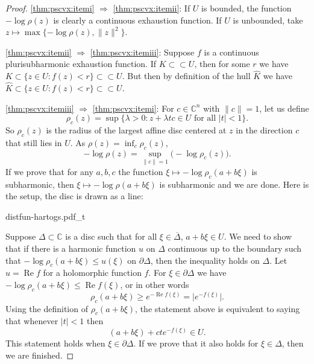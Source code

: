 \documentclass[12pt,openany]{book}
\renewcommand{\Re}{\operatorname{Re}}
\newcommand{\sabs}[1]{\lvert {#1} \rvert}
\newcommand{\snorm}[1]{\lVert {#1} \rVert}
\newcommand{\babs}[1]{\bigl\lvert {#1} \bigr\rvert}
\newcommand{\C}{{\mathbb{C}}}
\newcommand{\D}{{\mathbb{D}}}
\theoremstyle{plain}
\theoremstyle{remark}
\theoremstyle{definition}
\theoremstyle{exercise}
\theoremstyle{example}
\begin{document}
\begin{proof}
\eqref{thm:pscvx:itemi}
$\Rightarrow$
\eqref{thm:pscvx:itemii}:
If $U$ is bounded,
the function $-\log \rho(z)$ is clearly a continuous exhaustion function.
If $U$ is unbounded, take 
$z \mapsto \max \{ -\log \rho(z) , \snorm{z}^2 \}$.

\eqref{thm:pscvx:itemii}
$\Rightarrow$
\eqref{thm:pscvx:itemiii}:
Suppose $f$ is a continuous plurisubharmonic exhaustion function.
If $K \subset \subset U$, then for some $r$ we have
$K \subset \{ z \in U : f(z) < r \} \subset \subset U$.
But then by definition of the hull $\widehat{K}$ we have
$\widehat{K} \subset \{ z \in U : f(z) < r \} \subset \subset U$.

\eqref{thm:pscvx:itemiii}
$\Rightarrow$
\eqref{thm:pscvx:itemi}:
For $c \in \C^n$ with $\snorm{c}=1$, let us define
\begin{equation*}
\rho_c(z) =
\sup \bigl\{ \lambda > 0 :
z+ \lambda t c \in U \text{ for all $\sabs{t} < 1$} \bigr\} .
\end{equation*}
So $\rho_c(z)$ is the radius of the largest affine disc centered at $z$
in the direction $c$ that still lies in $U$.
As $\rho(z) = \inf_c \rho_c(z)$,
\begin{equation*}
- \log \rho(z) = \sup_{\snorm{c}=1} \bigl(-\log \rho_c(z)\bigr) .
\end{equation*}
If we prove that for any $a, b, c$ the function $\xi \mapsto -\log \rho_c(a+b\xi)$ is
subharmonic, then $\xi \mapsto - \log \rho(a+b\xi)$ is subharmonic and we are done.
Here is the setup, the disc is drawn as a line:

\begin{center}
{distfun-hartogs.pdf_t}
\end{center}

Suppose $\Delta \subset \C$ is a disc such that for all $\xi \in
\overline{\Delta}$, $a+b\xi \in U$.  We need to show that if there is a
harmonic function $u$ on $\Delta$ continuous up to the boundary such
that $- \log \rho_c(a+b\xi) \leq u(\xi)$ on $\partial \Delta$, then
the inequality holds on $\Delta$.  Let $u = \Re f$ for a holomorphic
function $f$.
For $\xi \in \partial \Delta$ we have  $- \log \rho_c(a+b\xi) \leq \Re
f(\xi)$,
or in other words
\begin{equation*}
\rho_c(a+b\xi) \geq e^{-\Re f(\xi)} = \babs{e^{-f(\xi)}}.
\end{equation*}
Using the definition of $\rho_c(a+b\xi)$, the statement above is equivalent
to saying that whenever $\sabs{t} < 1$ then 
\begin{equation*}
(a+b\xi)+cte^{-f(\xi)} \in U .
\end{equation*}
This statement holds when $\xi \in \partial \Delta$.  If we prove that it also
holds for $\xi \in \Delta$, then we are finished.


\end{proof}
\end{document}
